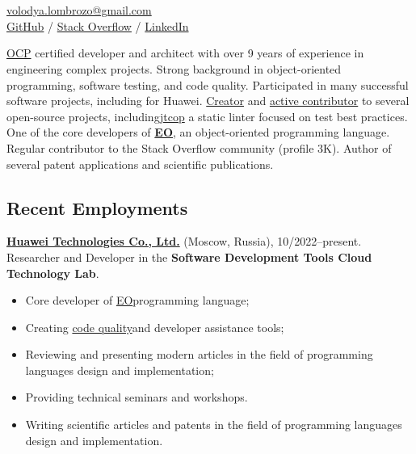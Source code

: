\documentclass{vl}
\begin{document}
    \vlPrintPhoto{}

    \section*{\Large {}}

    \href{mailto:volodya.lombrozo@gmail.com}{volodya.lombrozo@gmail.com}\\%
    \href{https://github.com/volodya-lombrozo}{GitHub} /
    \href{https://stackoverflow.com/users/10423604/volodya-lombrozo}{Stack Overflow} /
    \href{https://www.linkedin.com/in/vladimir-zakharov-lombrozo-b71744216/}{LinkedIn}

    \vspace*{12pt}

    \href{https://catalog-education.oracle.com/pls/certview/sharebadge?id=87F6A2FE819A5A5AF4120A05900AB28A461EE9A3EE9FBFA02721FADAEB3BCE19}{OCP}
    certified developer and architect with over 9 years of experience in engineering complex projects.
    Strong background in object-oriented programming, software testing, and code quality.
    Participated in many successful software projects, including for Huawei.
    \href{https://github.com/volodya-lombrozo?tab=repositories}{Creator} and
    \href{https://github.com/volodya-lombrozo}{active contributor} to several open-source projects,
    including\href{https://github.com/volodya-lombrozo/jtcop}{jtcop} a static linter focused on test best practices.
    One of the core developers of \textbf{\href{https://www.eolang.org}{EO}}, an object-oriented programming language.
    Regular contributor to the Stack Overflow community (profile 3K).
    Author of several patent applications and scientific publications.

    \subsection*{Recent Employments}

    \textbf{\href{https://www.huawei.com}{Huawei Technologies Co., Ltd.}} (Moscow, Russia), 10/2022--present.\newline
    Researcher and Developer in the \textbf{Software Development Tools Cloud Technology Lab}.

    \begin{itemize}
        \item Core developer of \href{https://github.com/objectionary/eo}{EO}programming language;
        \item
        Creating \href{https://github.com/volodya-lombrozo/jtcop}{code quality}and developer assistance tools;
        \item Reviewing and presenting modern articles in the field of programming languages design and implementation;
        \item Providing technical seminars and workshops.
        \item Writing scientific articles and patents in the field of programming languages design and implementation.
    \end{itemize}
\end{document}
